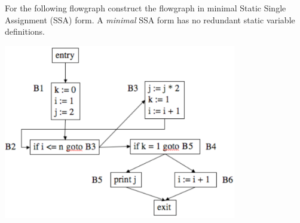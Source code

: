 \documentclass[12pt]{article}
\begin{document}
\begin{exe}
\begin{xlist}

  {\ex\label{ssa} For the following flowgraph construct the flowgraph
  in minimal Static Single Assignment (SSA) form. A {\em minimal} SSA form
  has no redundant static variable definitions.

  \begin{center}
  \includegraphics[height=3in]{figures/ssa-ex1-input}
  \end{center}

}
\end{xlist}
\end{exe}
\end{document}
